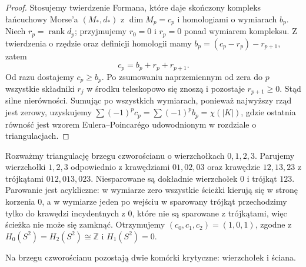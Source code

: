 \begin{proof}
Stosujemy twierdzenie Formana, które daje skończony
kompleks łańcuchowy Morse'a $(M_*,d_*)$ z
$\dim M_p=c_p$ i homologiami o wymiarach $b_p$.
Niech $r_p=\operatorname{rank}d_p$; przyjmujemy
$r_0=0$ i $r_p=0$ ponad wymiarem kompleksu.
Z twierdzenia o rzędzie oraz definicji homologii mamy
$b_p=(c_p-r_p)-r_{p+1}$, zatem
\[
 c_p=b_p+r_p+r_{p+1}.
\]
Od razu dostajemy $c_p\ge b_p$.
Po zsumowaniu naprzemiennym od zera do $p$
wszystkie składniki $r_j$ w środku teleskopowo
się znoszą i pozostaje $r_{p+1}\ge0$. Stąd silne
nierówności. Sumując po wszystkich wymiarach,
ponieważ najwyższy rząd jest zerowy, uzyskujemy
$\sum(-1)^pc_p=\sum(-1)^pb_p=\chi(|K|)$,
gdzie ostatnia równość jest wzorem Eulera--Poincarégo
udowodnionym w rozdziale o triangulacjach.
\end{proof}

\begin{przyklad}
Rozważmy triangulację brzegu czworościanu o wierzchołkach
$0,1,2,3$. Parujemy wierzchołki $1,2,3$
odpowiednio z krawędziami $01,02,03$ oraz krawędzie
$12,13,23$ z trójkątami $012,013,023$.
Niesparowane są dokładnie wierzchołek $0$ i trójkąt
$123$. Parowanie jest acykliczne: w wymiarze zero
wszystkie ścieżki kierują się w stronę korzenia $0$,
a w wymiarze jeden po wejściu w sparowany trójkąt
przechodzimy tylko do krawędzi incydentnych z $0$,
które nie są sparowane z trójkątami, więc ścieżka
nie może się zamknąć. Otrzymujemy
$(c_0,c_1,c_2)=(1,0,1)$, zgodne z
$H_0(S^2)=H_2(S^2)\cong\mathbb Z$ i $H_1(S^2)=0$.
\end{przyklad}

\begin{samepage}
\begin{center}
\begin{minipage}{.96\linewidth}\centering
{}\par\smallskip

{\footnotesize Na brzegu czworościanu pozostają dwie komórki
krytyczne: wierzchołek i ściana.}
\end{minipage}
\end{center}
\end{samepage}

